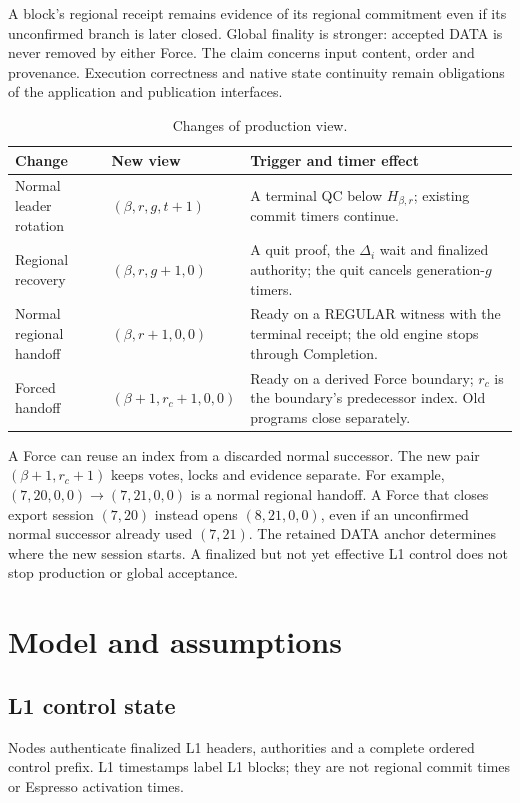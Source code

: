 \documentclass[11pt,a4paper]{article}
\begin{document}
A block's regional receipt remains evidence of its regional commitment
even if its unconfirmed branch is later closed. Global finality is
stronger: accepted DATA is never removed by either Force.
The claim concerns input content, order and provenance. Execution
correctness and native state continuity remain obligations of the
application and publication interfaces.

\begin{table}[htbp]\centering\small
\caption{Changes of production view.}\label{tab:views}
\begin{tabularx}{\linewidth}{@{}>{\raggedright\arraybackslash}p{.19\linewidth}>{\raggedright\arraybackslash}p{.25\linewidth}Y@{}}\toprule
Change & New view & Trigger and timer effect\\\midrule
Normal leader rotation & $(\beta,r,g,t+1)$ & A terminal QC below $H_{\beta,r}$;
existing commit timers continue.\\
Regional recovery & $(\beta,r,g+1,0)$ & A quit proof, the $\Delta_i$ wait
and finalized authority; the quit cancels generation-$g$ timers.\\
Normal regional handoff & $(\beta,r+1,0,0)$ & Ready on a REGULAR witness
with the terminal receipt; the old engine stops through Completion.\\
Forced handoff & $(\beta+1,r_c+1,0,0)$ & Ready on a derived Force boundary;
$r_c$ is the boundary's predecessor index. Old programs close separately.\\
\bottomrule\end{tabularx}
\end{table}

A Force can reuse an index from a discarded normal successor.
The new pair $(\beta+1,r_c+1)$ keeps votes, locks and evidence separate.
For example, $(7,20,0,0)\to(7,21,0,0)$ is a normal regional
handoff. A Force that closes export session $(7,20)$ instead opens
$(8,21,0,0)$, even if an unconfirmed normal successor already used
$(7,21)$. The retained DATA anchor determines where the new session starts.
A finalized but not yet effective L1 control does not stop production
or global acceptance.

\section{Model and assumptions}
\label{sec:model}
\subsection{L1 control state}
\label{sec:l1}
Nodes authenticate finalized L1 headers, authorities and a complete
ordered control prefix. L1 timestamps label L1 blocks; they are not
regional commit times or Espresso activation times.
\end{document}
